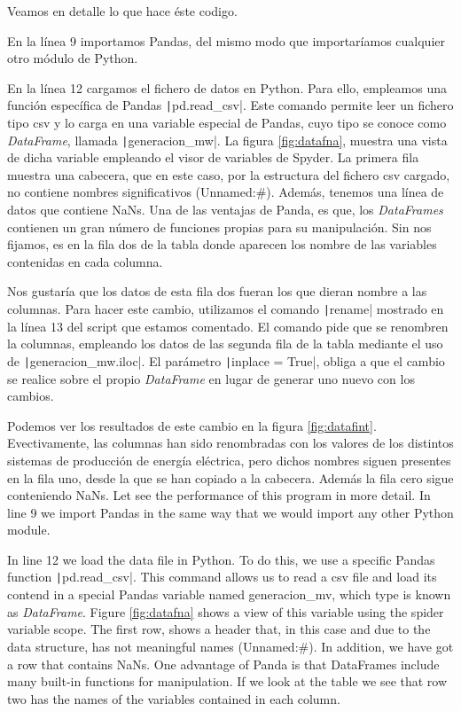 \begin{paracol}{2}
 	
Veamos en detalle lo que hace éste codigo.

En la línea 9 importamos Pandas, del mismo modo que importaríamos cualquier otro módulo de Python. 

En la línea 12 cargamos el fichero de datos en Python. Para ello, empleamos una función específica de Pandas \texttt|pd.read_csv|. Este comando permite leer un fichero tipo csv y lo carga en una variable especial de Pandas, cuyo tipo se conoce como \emph{DataFrame}, llamada \texttt|generacion_mw|. La figura \ref{fig:datafna}, muestra una vista de dicha variable empleando el visor de variables de Spyder. La primera fila muestra una cabecera, que en este caso, por la estructura del fichero csv cargado, no contiene nombres significativos (Unnamed:\#). Además, tenemos una línea de datos que contiene NaNs. Una de las ventajas de Panda, es que, los \emph{DataFrames} contienen un gran número de funciones propias para su manipulación. Sin nos fijamos, es en la fila dos de la tabla donde aparecen los nombre de las variables contenidas en cada columna.

Nos gustaría que los datos de esta fila dos fueran los que dieran nombre a las columnas. Para hacer este cambio, utilizamos el comando \texttt|rename| mostrado en la línea 13 del script que estamos comentado. El comando pide que se renombren la columnas, empleando los datos de las segunda fila de la tabla mediante el uso de \texttt|generacion_mw.iloc|. El parámetro \texttt|inplace = True|, obliga a que el cambio se realice sobre el propio \emph{DataFrame} en lugar de generar uno nuevo con los cambios.

Podemos ver los resultados de este cambio en la figura \ref{fig:datafint}. Evectivamente, las columnas han sido renombradas con los valores de los distintos sistemas de producción de energía eléctrica, pero dichos nombres siguen presentes en la fila uno, desde la que se han copiado a la cabecera. Además la fila cero sigue conteniendo NaNs.
\switchcolumn
Let see the performance of this program in more detail.
In line 9 we import Pandas in the same way that we would import any other Python module.

In line 12 we load the data file in Python. To do this, we use a specific Pandas function \texttt|pd.read_csv|. This command allows us to read a csv file and load its contend in a special Pandas variable named generacion\_mv, which type is known as \emph{DataFrame}. Figure \ref{fig:datafna} shows a view of this variable using the spider variable scope. The first row, shows a header that, in this case and due to the data structure, has not meaningful names (Unnamed:\#). In addition, we have got a row that contains NaNs. One advantage of Panda is that DataFrames include many built-in functions for manipulation. If we look at the table we see that row two has the names of the variables contained in each column.


\end{paracol}
